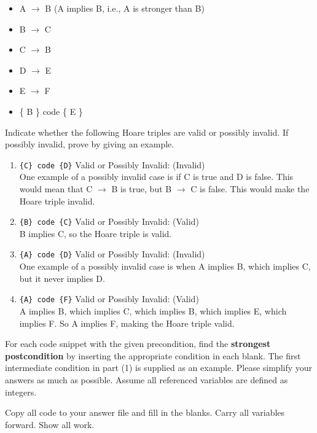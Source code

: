 \documentclass[11pt]{article}
\begin{document}
\begin{itemize}
\item A $\rightarrow$ B (A implies B, i.e., A is stronger than B)
\item B $\rightarrow$ C
\item C $\rightarrow$ B
\item D $\rightarrow$ E
\item E $\rightarrow$ F
\item \{ B \} code \{ E \}
\end{itemize}
 
Indicate whether the following Hoare triples are valid or possibly invalid. 
If possibly invalid, prove by giving an example.

\begin{enumerate}
\item \texttt{\{C\} code \{D\}} Valid or Possibly Invalid: (Invalid)
\\One example of a possibly invalid case is if C is true and D is false. This would mean that C $\rightarrow$ B is true, but B $\rightarrow$ C is false. This would make the Hoare triple invalid.
\item \texttt{\{B\} code \{C\}} Valid or Possibly Invalid: (Valid)
\\B implies C, so the Hoare triple is valid.
\item \texttt{\{A\} code \{D\}} Valid or Possibly Invalid: (Invalid)
\\One example of a possibly invalid case is when A implies B, which implies C, but it never implies D.
\item \texttt{\{A\} code \{F\}} Valid or Possibly Invalid: (Valid)
\\A implies B, which implies C, which implies B, which implies E, which implies F. So A implies F, making the Hoare triple valid.
\end{enumerate}

\newline
For each code snippet with the given precondition, find the \textbf{strongest postcondition} by inserting the appropriate condition in each blank. The first intermediate condition in part (1) is supplied as an example. Please simplify your answers as much as possible. Assume all referenced variables are defined as integers.
\newline

Copy all code to your answer file and fill in the blanks. Carry all variables forward. Show all work.
\end{document}
